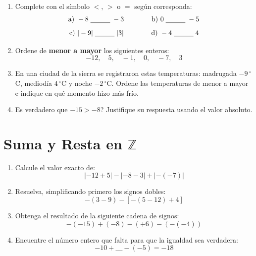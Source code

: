 \documentclass[12pt, letterpaper]{article}
\newcommand{\Z}{\mathbb{Z}}
\begin{document}
\begin{enumerate}[leftmargin=*]
  \item Complete con el símbolo $<$, $>$ o $=$ según corresponda:
        \[
          \text{a) } -8 \;\rule[-2pt]{1cm}{0.4pt}\; -3 \qquad \qquad
          \text{b) } 0 \;\rule[-2pt]{1cm}{0.4pt}\; -5
        \]
        \[
          \text{c) } |-9| \;\rule[-2pt]{1cm}{0.4pt}\; |3| \qquad \qquad
          \text{d) } -4 \;\rule[-2pt]{1cm}{0.4pt}\; 4
        \]

  \item Ordene de \textbf{menor a mayor} los siguientes enteros:
        \[
          -12, \quad 5, \quad -1, \quad 0, \quad -7, \quad 3
        \]

  \item En una ciudad de la sierra se registraron estas temperaturas: madrugada $-9\,^{\circ}$C, mediodía $4\,^{\circ}$C y noche $-2\,^{\circ}$C. Ordene las temperaturas de menor a mayor e indique en qué momento hizo más frío.

  \item \textquestiondown Es verdadero que $-15 > -8$? Justifique su respuesta usando el valor absoluto.
\end{enumerate}

\newpage

\section{Suma y Resta en $\Z$}

\begin{enumerate}[leftmargin=*]
  \item Calcule el valor exacto de:
        \[
          |-12 + 5| - |-8 - 3| + |-(-7)|
        \]

  \item Resuelva, simplificando primero los signos dobles:
        \[
          -(3 - 9) - [-(5 - 12) + 4]
        \]

  \item Obtenga el resultado de la siguiente cadena de signos:
        \[
          -(-15) + (-8) - (+6) - (-(-4))
        \]

  \item Encuentre el número entero que falta para que la igualdad sea verdadera:
        \[
          -10 + \_\_\_ - (-5) = -18
        \]
\end{enumerate}
\end{document}
